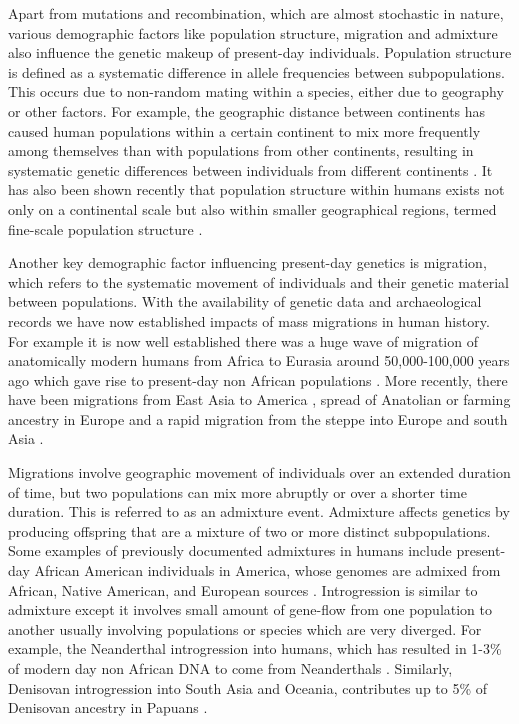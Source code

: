 Apart from mutations and recombination, which are almost stochastic in nature, various demographic factors like population structure, migration and admixture also influence the genetic makeup of present-day individuals. Population structure is defined as a systematic difference in allele frequencies between subpopulations. This occurs due to non-random mating within a species, either due to geography or other factors. For example, the geographic distance between continents has caused human populations within a certain continent to mix more frequently among themselves than with populations from other continents, resulting in systematic genetic differences between individuals from different continents \cite{rosenberg2002genetic}. It has also been shown recently that population structure within humans exists not only on a continental scale but also within smaller geographical regions, termed fine-scale population structure \cite{novembre2008genes,leslie2015fine,auton2015global}.

Another key demographic factor influencing present-day genetics is migration, which refers to the systematic movement of individuals and their genetic material between populations. With the availability of genetic data and archaeological records we have now established impacts of mass migrations in human history. For example it is now well established there was a huge wave of migration of anatomically modern humans from Africa to Eurasia around 50,000-100,000 years ago which gave rise to present-day non African populations \cite{lopez2015human}. More recently, there have been migrations from East Asia to America \cite{reich2012reconstructing}, spread of Anatolian or farming ancestry in Europe \cite{lazaridis2014ancient} and a rapid migration from the steppe into Europe and south Asia \cite{haak2015massive}.

Migrations involve geographic movement of individuals over an extended duration of time, but two populations can mix more abruptly or over a shorter time duration. This is referred to as an admixture event. Admixture affects genetics by producing offspring that are a mixture of two or more distinct subpopulations. Some examples of previously documented admixtures in humans include present-day African American individuals in America, whose genomes are admixed from African, Native American, and European sources \cite{smith2004high, price2009sensitive}. Introgression is similar to admixture except it involves small amount of gene-flow from one population to another usually involving populations or species which are very diverged. For example, the Neanderthal introgression into humans, which has resulted in 1-3\% of modern day non African DNA to come from Neanderthals \cite{sankararaman2014genomic}. Similarly, Denisovan introgression into South Asia and Oceania, contributes up to 5\% of Denisovan ancestry in Papuans \cite{reich2010genetic}. 


